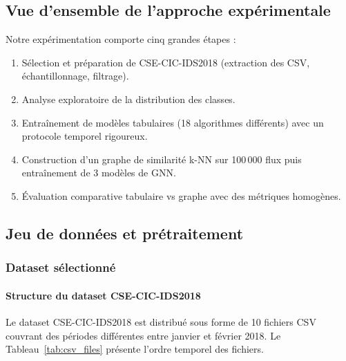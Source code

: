 ﻿\documentclass[11pt,a4paper]{article}
\begin{document}
\subsection{Vue d'ensemble de l'approche expérimentale}

Notre expérimentation comporte cinq grandes étapes :
\begin{enumerate}
    \item Sélection et préparation de CSE-CIC-IDS2018 (extraction des CSV, échantillonnage, filtrage).
    \item Analyse exploratoire de la distribution des classes.
    \item Entraînement de modèles tabulaires (18 algorithmes différents) avec un protocole temporel rigoureux.
    \item Construction d'un graphe de similarité k-NN sur 100\,000 flux puis entraînement de 3 modèles de GNN.
    \item Évaluation comparative tabulaire vs graphe avec des métriques homogènes.
\end{enumerate}

\subsection{Jeu de données et prétraitement}

\subsubsection{Dataset sélectionné}

\paragraph{Structure du dataset CSE-CIC-IDS2018}

Le dataset CSE-CIC-IDS2018 est distribué sous forme de 10 fichiers CSV couvrant des périodes différentes entre janvier et février 2018. Le Tableau~\ref{tab:csv_files} présente l'ordre temporel des fichiers.
\end{document}

